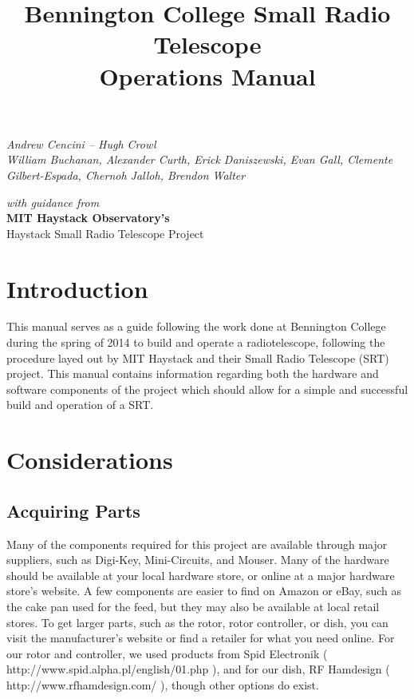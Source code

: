 \documentclass[11pt]{article} %
\title{\huge{Bennington College Small Radio Telescope} \\ Operations Manual}
\author{}
\date{} %
\begin{document}
\maketitle


\vspace{4cm}

\begin{center}
\emph{\Large{Andrew Cencini – Hugh Crowl} \\ 
\large{William Buchanan, Alexander Curth, Erick Daniszewski, Evan Gall,
Clemente Gilbert-Espada, Chernoh Jalloh, Brendon Walter}}
\end{center}


\vspace{7cm}

\begin{center}
\emph{with guidance from} \\ 
\Large{\textbf{MIT Haystack Observatory's}} \\ 
Haystack Small Radio Telescope Project
\end{center}
\normalsize

\tableofcontents

\newpage

\section{Introduction}

This manual serves as a guide following the work done at Bennington College during the spring of 2014 to build and operate a radiotelescope, following the procedure layed out by MIT Haystack and their Small Radio Telescope (SRT) project. This manual contains information regarding both the hardware and software components of the project which should allow for a simple and successful build and operation of a SRT.


\section{Considerations}

\subsection{Acquiring Parts}

Many of the components required for this project are available through major suppliers, such as Digi-Key, Mini-Circuits, and Mouser. Many of the hardware should be available at your local hardware store, or online at a major hardware store's website. A few components are easier to find on Amazon or eBay, such as the cake pan used for the feed, but they may also be available at local retail stores. To get larger parts, such as the rotor, rotor controller, or dish, you can visit the manufacturer's website or find a retailer for what you need online. For our rotor and controller, we used products from Spid Electronik ( http://www.spid.alpha.pl/english/01.php ), and for our dish, RF Hamdesign ( http://www.rfhamdesign.com/ ), though other options do exist.
\end{document}
